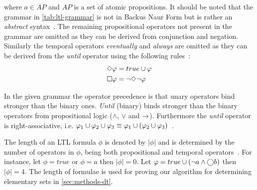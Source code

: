 

where $a \in AP$ and $AP$ is a set of atomic propositions. It should be noted that the grammar in \autoref{tab:ltl-grammar} is not in Backus Naur Form but is rather an \emph{abstract} syntax~\cite{baier2008principles}. The remaining propositional operators not present in the grammar are omitted as they can be derived from conjunction and negation. Similarly the temporal operators \emph{eventually} and \emph{always} are omitted as they can be derived from the \emph{until} operator using the following rules~\cite[pp.~232]{baier2008principles}:
\begin{align}
    &\Diamond \varphi = true \cup \varphi \label{eq:eventually} \\
    &\square \varphi = \lnot \Diamond \lnot \varphi \label{eq:always}
\end{align}

In the given grammar the operator precedence is that unary operators bind stronger than the binary ones. \emph{Until} (binary) binds stronger than the binary operators from propositional logic ($\land$, $\lor$ and $\rightarrow$). Furthermore the \emph{until} operator is right-associative, i.e. $\varphi_1 \cup \varphi_2 \cup \varphi_3 \equiv \varphi_1 \cup \left(\varphi_2 \cup \varphi_3\right)$~\cite{baier2008principles}.

The length of an LTL formula $\phi$ is denoted by $| \phi |$ and is determined by the number of operators in $\phi$, being both propositional and temporal operators~\cite{baier2008principles}. For instance, let $\phi= true$ or $\phi= a$ then $| \phi | = 0$. Let $\varphi= true \cup \left( \lnot a \land \bigcirc b \right)$ then $| \phi | = 4$. The length of formulae is used for proving our algorithm for determining elementary sets in \autoref{sec:methods-dt}.

